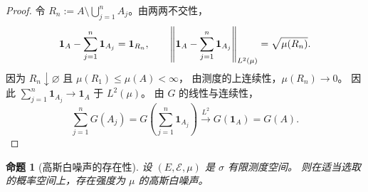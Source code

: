 \documentclass[UTF8,11pt,a4paper,oneside,fontset=fandol]{ctexrep}
\numberwithin{equation}{section}
\theoremstyle{plain}
\newtheorem{proposition}[theorem]{命题}
\theoremstyle{definition}
\theoremstyle{remark}
\newcommand{\ind}[1]{\mathbf{1}_{#1}}
\DeclarePairedDelimiter{\norm}{\lVert}{\rVert}
\newcommand{\Lpto}[1]{\xrightarrow{L^{#1}}}
\begin{document}
\begin{proof}
令 $R_n:=A\setminus\bigcup_{j=1}^{n}A_j$。由两两不交性，
\[
  \ind{A}-\sum_{j=1}^{n}\ind{A_j}=\ind{R_n},
  \qquad
  \norm*{\ind{A}-\sum_{j=1}^{n}\ind{A_j}}_{L^2(\mu)}
  =\sqrt{\mu(R_n)}.
\]
因为 $R_n\downarrow\varnothing$ 且 $\mu(R_1)\le\mu(A)<\infty$，
由测度的上连续性，$\mu(R_n)\to0$。
因此 $\sum_{j=1}^{n}\ind{A_j}\to\ind{A}$ 于 $L^2(\mu)$。
由 $G$ 的线性与连续性，
\[
  \sum_{j=1}^{n}G(A_j)
  =G\!\left(\sum_{j=1}^{n}\ind{A_j}\right)
  \Lpto{2}G(\ind{A})=G(A).
\]
\end{proof}

\begin{proposition}[高斯白噪声的存在性]
\label{prop:gaussian-white-noise-existence}
设 $(E,\mathcal{E},\mu)$ 是 $\sigma$ 有限测度空间。
则在适当选取的概率空间上，存在强度为 $\mu$ 的高斯白噪声。
\end{proposition}
\end{document}
